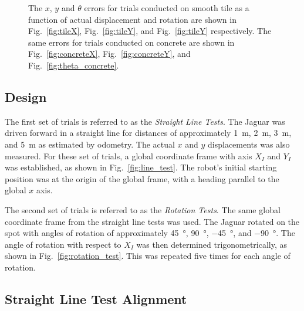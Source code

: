 \documentclass[conference]{../IEEEtran}
\begin{document}
\begin{figure}[t]
  \caption{The $x$, $y$ and $\theta$ errors for trials conducted on smooth tile as
           a function of actual displacement and rotation are
           shown in Fig.~\ref{fig:tileX}, Fig.~\ref{fig:tileY}, and Fig.~\ref{fig:tileY}
           respectively. The same errors for trials conducted on concrete are shown in
           Fig.~\ref{fig:concreteX}, Fig.~\ref{fig:concreteY}, and Fig.~\ref{fig:theta_concrete}.}
  \label{fig:odo_errors}
\end{figure}

\subsection{Design}

The first set of trials is referred to as the \emph{Straight Line Tests}.
The Jaguar was driven forward in a straight line for distances of approximately
\SI{1}{\meter}, \SI{2}{\meter}, \SI{3}{\meter}, and \SI{5}{\meter} as estimated by odometry.
The actual $x$ and $y$ displacements was also measured. For these set of trials, a global
coordinate frame with axis $X_I$ and $Y_I$ was established, as shown in
Fig.~\ref{fig:line_test}. The robot's initial starting position was at the
origin of the global frame, with a heading parallel to the global $x$ axis.

The second set of trials is referred to as the \emph{Rotation Tests}. The same global
coordinate frame from the straight line tests was used. The Jaguar rotated on the spot
with angles of rotation of approximately \SI{45}{\degree}, \SI{90}{\degree},
\SI{-45}{\degree}, and \SI{-90}{\degree}. The angle of rotation with respect to $X_I$ was
then determined trigonometrically, as shown in Fig.~\ref{fig:rotation_test}. This was
repeated five times for each angle of rotation.

\subsection{Straight Line Test Alignment}
\end{document}
